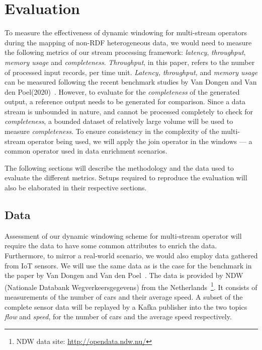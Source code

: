 \chapter{Evaluation}
\label{chap:Evaluation}

To measure the effectiveness of dynamic windowing for multi-stream operators during the 
mapping of non-RDF heterogeneous data, we would need to measure the following 
metrics of our stream processing framework: \emph{latency}, \emph{throughput},
\emph{memory usage} and \emph{completeness}. \emph{Throughput}, in this 
paper, refers to the number of processed input records, per time unit.
\emph{Latency, throughput,} and \emph{memory usage} can be measured following the recent benchmark studies by 
Van Dongen and Van den Poel(2020)~\cite{evalution_of_spe}.
However, to evaluate 
for the \emph{completeness}
of the generated output, a reference output needs 
to be generated for comparison. Since a data stream is unbounded in nature, 
and cannot be processed completely to check for \emph{completeness}, a bounded 
dataset of relatively large volume will be used to measure \emph{completeness}.
To ensure consistency in the complexity of the multi-stream operator being used, 
we will apply the join operator in the windows --- a common operator used in 
data enrichment scenarios. 

The following sections will describe the methodology and the data used to evaluate the
different metrics. Setups required to reproduce the evaluation will also be elaborated 
in their respective sections. 


\section{Data}

Assessment of our dynamic windowing scheme for multi-stream operator will require 
the data to have some common attributes to enrich the data. Furthermore, to 
mirror a real-world scenario, we would also employ data gathered from IoT sensors. 
We will use the same data 
as is the case for the benchmark in the paper by Van Dongen and Van den Poel~\cite{evalution_of_spe}. 
The data is provided by NDW (Nationale Databank Wegverkeersgegevens) from the 
Netherlands~\footnote{NDW data site: \href{http://opendata.ndw.nu/}{http://opendata.ndw.nu/} }.
 It consists of measurements of the number of cars and their average speed. 
A subset of the complete sensor data will be replayed by a Kafka publisher into the two topics 
\emph{flow} and \emph{speed}, for the number of cars and the average speed respectively. 

